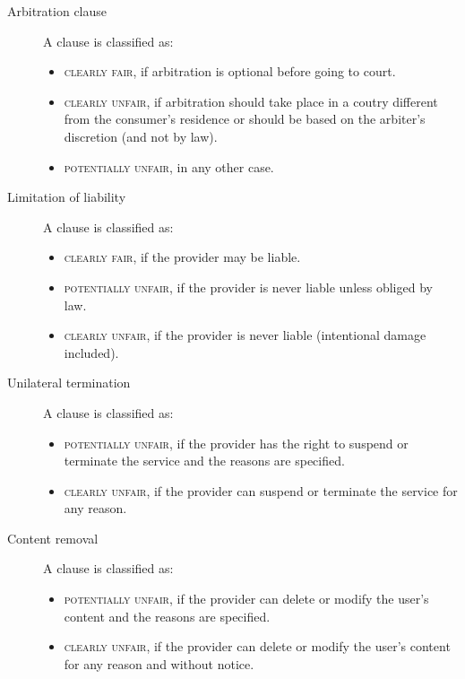 \begin{description}
    \item[Arbitration clause] 
        A clause is classified as:
        \begin{itemize}
            \item \textsc{clearly fair}, if arbitration is optional before going to court.
            \item \textsc{clearly unfair}, if arbitration should take place in a coutry different from the consumer's residence or should be based on the arbiter's discretion (and not by law).
            \item \textsc{potentially unfair}, in any other case.
        \end{itemize}

    \item[Limitation of liability] 
        A clause is classified as:
        \begin{itemize}
            \item \textsc{clearly fair}, if the provider may be liable.
            \item \textsc{potentially unfair}, if the provider is never liable unless obliged by law.
            \item \textsc{clearly unfair}, if the provider is never liable (intentional damage included).
        \end{itemize}
    
    \item[Unilateral termination] 
        A clause is classified as:
        \begin{itemize}
            \item \textsc{potentially unfair}, if the provider has the right to suspend or terminate the service and the reasons are specified.
            \item \textsc{clearly unfair}, if the provider can suspend or terminate the service for any reason.
        \end{itemize}

    \item[Content removal] 
        A clause is classified as:
        \begin{itemize}
            \item \textsc{potentially unfair}, if the provider can delete or modify the user's content and the reasons are specified.
            \item \textsc{clearly unfair}, if the provider can delete or modify the user's content for any reason and without notice.
        \end{itemize}
\end{description}



